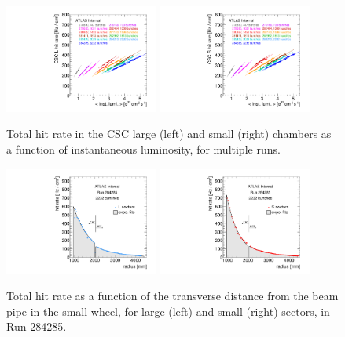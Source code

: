 \begin{figure}
  \begin{center}
    \includegraphics[width=0.45\textwidth]{./figures/rate_adc_vs_lumi_vs_evts_csc_CSL1_overlay.pdf}
    \includegraphics[width=0.45\textwidth]{./figures/rate_adc_vs_lumi_vs_evts_csc_CSS1_overlay.pdf}
    \caption{Total hit rate in the CSC large (left) and small (right) chambers as a function of instantaneous luminosity, for multiple runs.}
    \label{fig:hitrates-vs-lumi-csc-adc}
  \end{center}
\end{figure}

\begin{figure}
  \begin{center}
    \includegraphics[width=0.45\textwidth]{./figures/rate_adc_vs_r_L_00284285.pdf}
    \includegraphics[width=0.45\textwidth]{./figures/rate_adc_vs_r_S_00284285.pdf}
    \caption{Total hit rate as a function of the transverse distance from the beam pipe in the small wheel, for large (left) and small (right) sectors, in Run 284285.}
    \label{fig:hitrates-vs-r-adc}
  \end{center}
\end{figure}

